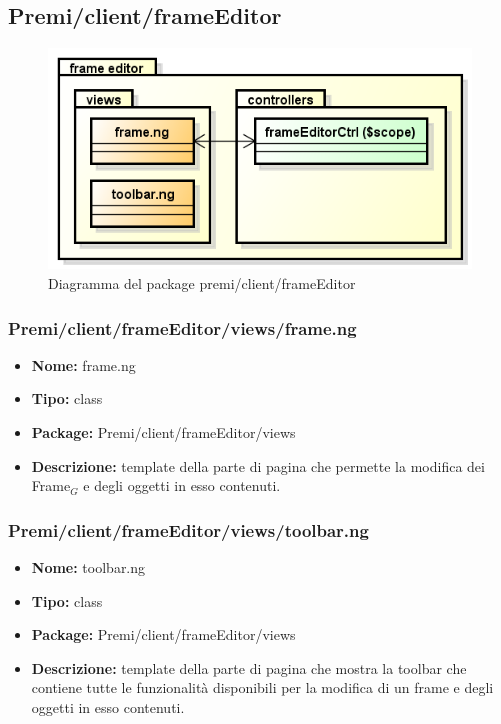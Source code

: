 \subsection{Premi/client/frameEditor}
\begin{figure}[!h]
\begin{center}
\includegraphics[scale=0.45]{img/diapkg/frameEditor.png}
\caption{Diagramma del package premi/client/frameEditor}
\end{center}
\end{figure}
\subsubsection{Premi/client/frameEditor/views/frame.ng}
\begin{itemize}
  \item[] \textbf{Nome:} frame.ng
  \item[] \textbf{Tipo:} class
  \item[] \textbf{Package:} Premi/client/frameEditor/views
  \item[] \textbf{Descrizione:} template della parte di pagina che permette la modifica dei Frame$_G$ e degli oggetti in esso contenuti.
\end{itemize}
\subsubsection{Premi/client/frameEditor/views/toolbar.ng}
\begin{itemize}
  \item[] \textbf{Nome:} toolbar.ng
  \item[] \textbf{Tipo:} class
  \item[] \textbf{Package:} Premi/client/frameEditor/views
  \item[] \textbf{Descrizione:} template della parte di pagina che mostra la toolbar che contiene tutte le funzionalità disponibili per la modifica di un frame e degli oggetti in esso contenuti.
\end{itemize}
